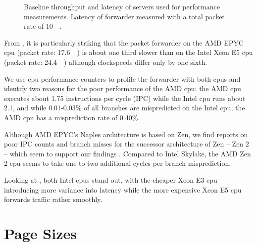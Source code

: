 \begin{figure}%
    \centering

    \caption{Baseline throughput and latency of servers used for performance
    measurements. Latency of forwarder measured with a total packet rate of
    \SI{10}{\mega\pps}.}
    \label{fig:baseline-perf}
\end{figure}

From , it is particularly striking that the
packet forwarder on the AMD EPYC \ac{cpu} (packet rate: \SI{17.6}{\mega\pps}) is
about one third slower than on the Intel Xeon E5 \ac{cpu} (packet rate:
\SI{24.4}{\mega\pps}) although clockspeeds differ only by one sixth.

We use \ac{cpu} performance counters to profile the forwarder with both
\acp{cpu} and identify two reasons for the poor performance of the AMD \ac{cpu}:
the AMD \ac{cpu} executes about 1.75 instructions per cycle (IPC) while the
Intel \ac{cpu} runs about 2.1, and while 0.01-0.03\% of all branches are
mispredicted on the Intel \ac{cpu}, the AMD \ac{cpu} has a misprediction rate of
0.40\%.

Although AMD EPYC's Naples architecture is based on Zen, we find reports on poor
IPC counts and branch misses for the successor architecture of Zen -- Zen 2 --
which seem to support our findings \cite{lemire2019instructions,
lemire2019mispredictions}. Compared to Intel Skylake, the AMD Zen 2 \ac{cpu}
seems to take one to two additional cycles per branch misprediction.

Looking at , both Intel \acp{cpu} stand out,
with the cheaper Xeon E3 \ac{cpu} introducing more variance into latency while
the more expensive Xeon E5 \ac{cpu} forwards traffic rather smoothly.


\section{Page Sizes}
\label{sec:page_sizes}


